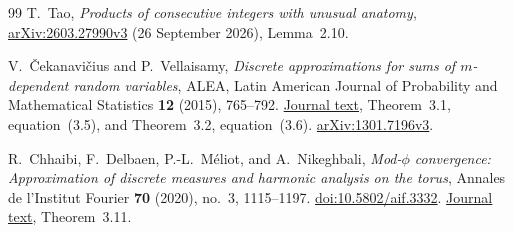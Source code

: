 \begin{thebibliography}{99}
T.~Tao,
\emph{Products of consecutive integers with unusual anatomy},
\href{https://arxiv.org/abs/2603.27990v3}{arXiv:2603.27990v3}
(26 September 2026), Lemma~2.10.

V.~\v{C}ekanavi\v{c}ius and P.~Vellaisamy,
\emph{Discrete approximations for sums of $m$-dependent random variables},
ALEA, Latin American Journal of Probability and Mathematical Statistics
\textbf{12} (2015), 765--792.
\href{https://alea.impa.br/articles/v12/12-29.pdf}{Journal text},
Theorem~3.1, equation~(3.5), and Theorem~3.2, equation~(3.6).
\href{https://arxiv.org/abs/1301.7196v3}{arXiv:1301.7196v3}.

R.~Chhaibi, F.~Delbaen, P.-L.~M\'eliot, and A.~Nikeghbali,
\emph{Mod-$\phi$ convergence: Approximation of discrete measures
and harmonic analysis on the torus},
Annales de l'Institut Fourier \textbf{70} (2020),
no.~3, 1115--1197.
\href{https://doi.org/10.5802/aif.3332}{doi:10.5802/aif.3332}.
\href{https://numdam.org/item/10.5802/aif.3332.pdf}{Journal text},
Theorem~3.11.

\end{thebibliography}
